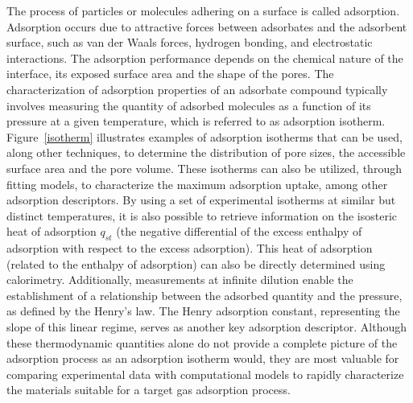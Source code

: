 \documentclass[main.tex]{subfiles}
\begin{document}
The process of particles or molecules adhering on a surface is called adsorption. Adsorption occurs due to attractive forces between adsorbates and the adsorbent surface, such as van der Waals forces, hydrogen bonding, and electrostatic interactions. The adsorption performance depends on the chemical nature of the interface, its exposed surface area and the shape of the pores. The characterization of adsorption properties of an adsorbate compound typically involves measuring the quantity of adsorbed molecules as a function of its pressure at a given temperature, which is referred to as adsorption isotherm. Figure~\ref{isotherm} illustrates examples of adsorption isotherms that can be used, along other techniques, to determine the distribution of pore sizes, the accessible surface area and the pore volume.\autocite{Rouquerol_1994} These isotherms can also be utilized, through fitting models, to characterize the maximum adsorption uptake, among other adsorption descriptors.\autocite{Wang_2020} By using a set of experimental isotherms at similar but distinct temperatures, it is also possible to retrieve information on the isosteric heat of adsorption $q_{st}$ (the negative differential of the excess enthalpy of adsorption with respect to the excess adsorption).\autocite{Nicholson2000} This heat of adsorption (related to the enthalpy of adsorption) can also be directly determined using calorimetry.\autocite{Dunne_1996} Additionally, measurements at infinite dilution enable the establishment of a relationship between the adsorbed quantity and the pressure, as defined by the Henry's law. The Henry adsorption constant, representing the slope of this linear regime,\autocite{Finsy2007} serves as another key adsorption descriptor. Although these thermodynamic quantities alone do not provide a complete picture of the adsorption process as an adsorption isotherm would, they are most valuable for comparing experimental data with computational models to rapidly characterize the materials suitable for a target gas adsorption process.
\end{document}
